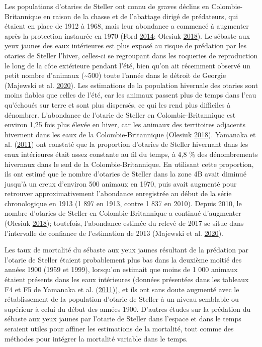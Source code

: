 \documentclass[french,11pt]{book}
\begin{document}
Les populations d'otaries de Steller ont connu de graves déclins en Colombie-Britannique en raison de la chasse et de l'abattage dirigé de prédateurs, qui étaient en place de 1912 à 1968, mais leur abondance a commencé à augmenter après la protection instaurée en 1970 (Ford \protect\hyperlink{ref-ford2014}{2014}; Olesiuk \protect\hyperlink{ref-olesiuk2018}{2018}). Le sébaste aux yeux jaunes des eaux intérieures est plus exposé au risque de prédation par les otaries de Steller l'hiver, celles-ci se regroupant dans les roqueries de reproduction le long de la côte extérieure pendant l'été, bien qu'on ait récemment observé un petit nombre d'animaux (\textasciitilde500) toute l'année dans le détroit de Georgie (Majewski et al. \protect\hyperlink{ref-majewski2020}{2020}). Les estimations de la population hivernale des otaries sont moins fiables que celles de l'été, car les animaux passent plus de temps dans l'eau qu'échoués sur terre et sont plus dispersés, ce qui les rend plus difficiles à dénombrer. L'abondance de l'otarie de Steller en Colombie-Britannique est environ 1,25 fois plus élevée en hiver, car les animaux des territoires adjacents hivernent dans les eaux de la Colombie-Britannique (Olesiuk \protect\hyperlink{ref-olesiuk2018}{2018}). Yamanaka et al. (\protect\hyperlink{ref-yamanaka2011}{2011}) ont constaté que la proportion d'otaries de Steller hivernant dans les eaux intérieures était assez constante au fil du temps, à 4,8 \% des dénombrements hivernaux dans le sud de la Colombie-Britannique. En utilisant cette proportion, ils ont estimé que le nombre d'otaries de Steller dans la zone 4B avait diminué jusqu'à un creux d'environ 500 animaux en 1970, puis avait augmenté pour retrouver approximativement l'abondance enregistrée au début de la série chronologique en 1913 (1 897 en 1913, contre 1 837 en 2010). Depuis 2010, le nombre d'otaries de Steller en Colombie-Britannique a continué d'augmenter (Olesiuk \protect\hyperlink{ref-olesiuk2018}{2018}); toutefois, l'abondance estimée du relevé de 2017 se situe dans l'intervalle de confiance de l'estimation de 2013 (Majewski et al. \protect\hyperlink{ref-majewski2020}{2020}).

Les taux de mortalité du sébaste aux yeux jaunes résultant de la prédation par l'otarie de Steller étaient probablement plus bas dans la deuxième moitié des années 1900 (1959 et 1999), lorsqu'on estimait que moins de 1 000 animaux étaient présents dans les eaux intérieures (données présentées dans les tableaux F4 et F5 de Yamanaka et al. (\protect\hyperlink{ref-yamanaka2011}{2011})), et ils ont sans doute augmenté avec le rétablissement de la population d'otarie de Steller à un niveau semblable ou supérieur à celui du début des années 1900. D'autres études sur la prédation du sébaste aux yeux jaunes par l'otarie de Steller dans l'espace et dans le temps seraient utiles pour affiner les estimations de la mortalité, tout comme des méthodes pour intégrer la mortalité variable dans le temps.
\end{document}
